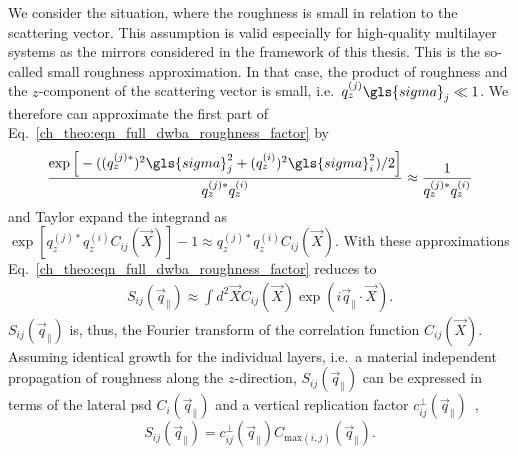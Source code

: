 We consider the situation, where the roughness is small in relation to the scattering vector. This assumption is valid especially for high-quality multilayer systems as the mirrors considered in the framework of this thesis. This is the so-called small roughness approximation. In that case, the product of roughness and the $z$-component of the scattering vector is small, i.e.~$q_z^{(j)} \gls{sigma}_j \ll 1$. We therefore can approximate the first part of Eq.~\eqref{ch_theo:eqn_full_dwba_roughness_factor} by
\begin{align}
\frac{\exp \Big[-((q_z^{(j)*})^2 \gls{sigma}_j^2 + (q_z^{(i)})^{2} \gls{sigma}_i^2)/2\Big]}{q_z^{(j)*} q_z^{(i)}} \approx \frac{1}{q_z^{(j)*} q_z^{(i)}}
\end{align}
and Taylor expand the integrand as $\exp [q_z^{(j)*} q_z^{(i)} C_{ij}(\vec{X})]-1 \approx q_z^{(j)*} q_z^{(i)} C_{ij}(\vec{X})$. With these approximations Eq.~\eqref{ch_theo:eqn_full_dwba_roughness_factor} reduces to
\begin{align}
S_{ij}(\vec{q}_\parallel) \approx \int d^2 \vec{X} C_{ij}(\vec{X}) \exp(i \vec{q}_\parallel \cdot \vec{X}) \text{.} \label{ch_theo:eqn_reduced_structure_factor}
\end{align}
$S_{ij}(\vec{q}_\parallel)$ is, thus, the Fourier transform of the correlation function $C_{ij}(\vec{X})$. Assuming identical growth for the individual layers, i.e.~a material independent propagation of roughness along the $z$-direction, $S_{ij}(\vec{q}_\parallel)$ can be expressed in terms of the lateral \gls{psd} $C_{i}(\vec{q}_\parallel)$ and a vertical replication factor $c_{ij}^{\perp}(\vec{q}_\parallel)$~\cite{spiller_multilayer_1993},
\begin{equation}
        S_{ij}(\vec{q}_\parallel) = c_{ij}^{\perp}(\vec{q}_\parallel) C_{\text{max}(i,j)}(\vec{q}_\parallel)\text{.} \label{ch_theo:eqn_factorized_structure_factor}
\end{equation}


